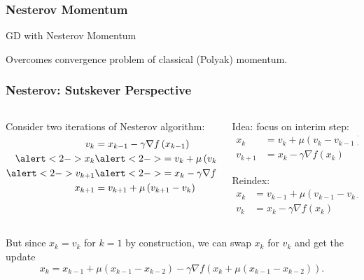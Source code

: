 \documentclass[aspectratio=1610,onlytextwidth]{beamer}
\begin{document}
\begin{frame}[c]
  \frametitle{Nesterov Momentum}
  \begin{algorithm}[H]
    \KwData{$\gamma >0$, $\mu \in [0,1)$}
    \caption{GD with Nesterov Momentum}
  \end{algorithm}

  \bigskip

  Overcomes convergence problem of classical (Polyak) momentum.

\end{frame}

\begin{frame}[c]
  \frametitle{Nesterov: Sutskever Perspective}
  \begin{columns}[T]
    \begin{column}{0.45\textwidth}
      Consider two iterations of Nesterov algorithm:
      \[
        \begin{aligned}
          v_{k}               & = x_{k-1} - \gamma \nabla f\left(x_{k-1} \right)         \\
          \alert<2->{x_{k}}   & \alert<2->{= v_{k} + \mu\left(v_{k} - v_{{k-1}} \right)} \\
          \alert<2->{v_{k+1}} & \alert<2->{= x_{k} - \gamma \nabla f\left(x_{k} \right)} \\
          x_{k+1}             & = v_{k+1} + \mu\left(v_{k+1} - v_{k} \right)
        \end{aligned}
      \]
    \end{column}

    \pause

    \begin{column}{0.45\textwidth}
      Idea: focus on interim step:
      \[
        \begin{aligned}
          x_{k}   & = v_{k} + \mu\left(v_{k} - v_{{k-1}} \right) \\
          v_{k+1} & = x_{k} - \gamma \nabla f\left(x_{k} \right)
        \end{aligned}
      \]

      \pause

      Reindex:
      \[
        \begin{aligned}
          x_{k} & = v_{k-1} + \mu\left(v_{k-1} - v_{{k-2}} \right) \\
          v_{k} & = x_{k} - \gamma \nabla f\left(x_{k} \right)
        \end{aligned}
      \]
    \end{column}

  \end{columns}

  \pause \bigskip

  But since $x_k = v_k$ for $k=1$ by construction, we can swap $x_k$ for $v_k$ and
  get the update
  \[
    x_k = x_{k-1} + \mu(x_{k-1} - x_{k-2}) - \gamma \nabla f(x_{k} + \mu(x_{k-1} - x_{k-2})).
  \]
\end{frame}
\end{document}

